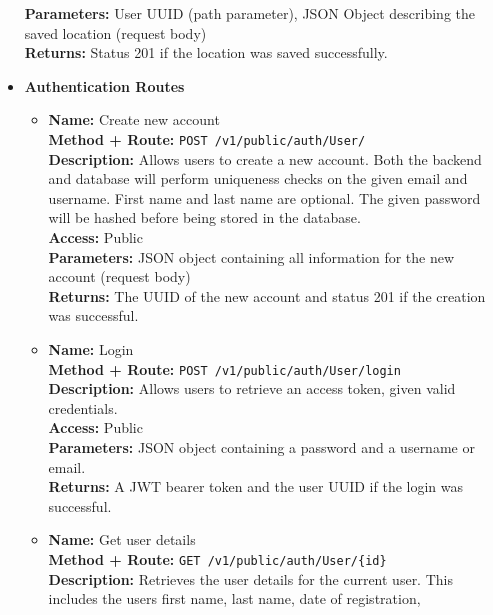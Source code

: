 \begin{itemize}
{\begin{itemize}
{        \textbf{Parameters:} User UUID (path parameter), JSON Object describing
        the saved location (request body)\\
        \textbf{Returns:} Status 201 if the location was saved successfully.\\
      }
    \end{itemize}
  }
  \item{
    \textbf{Authentication Routes}
    \begin{itemize}
      \item {
        \textbf{Name:} Create new account\\
        \textbf{Method + Route:} \texttt{POST /v1/public/auth/User/}\\
        \textbf{Description:} Allows users to create a new account. Both the
        backend and database will perform uniqueness checks on the given email
        and username. First name and last name are optional. The given password
        will be hashed before being stored in the database.\\
        \textbf{Access:} Public\\
        \textbf{Parameters:} JSON object containing all information for the new
        account (request body)\\
        \textbf{Returns:} The UUID of the new account and status 201 if the
        creation was successful.\\
      }
      \item {
        \textbf{Name:} Login\\
        \textbf{Method + Route:} \texttt{POST /v1/public/auth/User/login}\\
        \textbf{Description:} Allows users to retrieve an access token, given
        valid credentials.\\
        \textbf{Access:} Public\\
        \textbf{Parameters:} JSON object containing a password and a username or
        email.\\
        \textbf{Returns:} A JWT bearer token and the user UUID if the login was
        successful.\\
      }
      \item {
        \textbf{Name:} Get user details\\
        \textbf{Method + Route:} \texttt{GET /v1/public/auth/User/\{id\}}\\
        \textbf{Description:} Retrieves the user details for the current user.
        This includes the users first name, last name, date of registration,
}
\end{itemize}}
\end{itemize}

